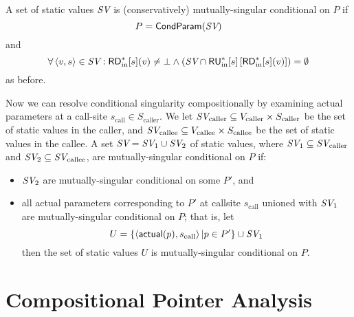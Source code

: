 \documentclass[11pt,notitlepage]{article}
\newcommand{\bigvar}[1]{\ensuremath{\text{\it #1}}}
\newcommand{\func}[1]{\ensuremath{\text{\sffamily #1}}}
\begin{document}
A set of static values $\bigvar{SV}$ is (conservatively)
mutually-singular conditional on $P$ if
$$P=\func{CondParam}(\bigvar{SV})$$ and
\begin{displaymath}
  \forall \tuple{v,s}\in \bigvar{SV} : \func{RD}^*_\text{in}[s](v) \neq \bot
  \wedge 
  \left(\bigvar{SV}\cap\func{RU}^*_\text{in}[s]\left[\func{RD}^*_\text{in}[s](v)\right]\right) = \emptyset
\end{displaymath}
as before.

Now we can resolve conditional singularity compositionally by
examining actual parameters at a call-site $s_\text{call}\in S_\text{caller}$.
We let 
$\bigvar{SV}_\text{caller} \subseteq 
  V_\text{caller} \times S_\text{caller}$
be the set of static values in the caller, and
$\bigvar{SV}_\text{callee} \subseteq 
  V_\text{callee} \times S_\text{callee}$
be the set of static values in the callee.
A set $\bigvar{SV}=\bigvar{SV}_1 \cup \bigvar{SV}_2$ of static values,
where $\bigvar{SV}_1\subseteq \bigvar{SV}_\text{caller}$ and
      $\bigvar{SV}_2\subseteq \bigvar{SV}_\text{callee}$,
are mutually-singular conditional on $P$ if:
\begin{itemize}
\item $\bigvar{SV}_2$ are mutually-singular conditional on some $P'$,
and
\item all actual parameters corresponding to $P'$ at callsite $s_\text{call}$
  unioned with $\bigvar{SV}_1$ are mutually-singular conditional on $P$;
  that is, let
\begin{displaymath}
U = 
\left\{\tuple{\func{actual}(p), s_\text{call}} | p \in P' \right\}
    \cup
\bigvar{SV}_1
\end{displaymath}
then the set of static values $U$ is mutually-singular conditional on $P$.
\end{itemize}



\section{Compositional Pointer Analysis}
\end{document}
